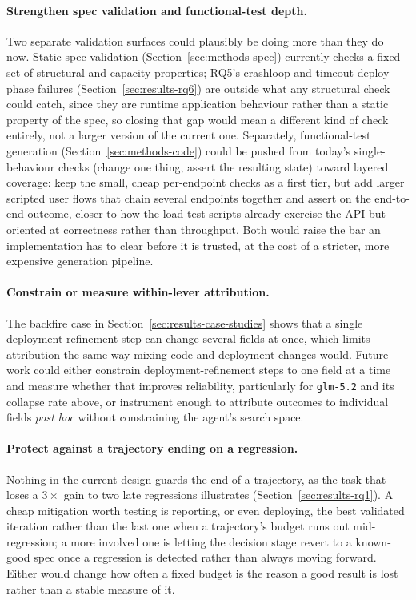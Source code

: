 \paragraph{Strengthen spec validation and functional-test depth.} Two
separate validation surfaces could plausibly be doing more than they do
now. Static spec validation (Section~\ref{sec:methods-spec}) currently
checks a fixed set of structural and capacity properties; RQ5's
crashloop and timeout deploy-phase failures
(Section~\ref{sec:results-rq6}) are outside what any structural check
could catch, since they are runtime application behaviour rather than a
static property of the spec, so closing that gap would mean a different
kind of check entirely, not a larger version of the current one.
Separately, functional-test generation (Section~\ref{sec:methods-code})
could be pushed from today's single-behaviour checks (change one thing,
assert the resulting state) toward layered coverage: keep the small,
cheap per-endpoint checks as a first tier, but add larger scripted user
flows that chain several endpoints together and assert on the
end-to-end outcome, closer to how the load-test scripts already exercise
the API but oriented at correctness rather than throughput. Both would
raise the bar an implementation has to clear before it is trusted, at the
cost of a stricter, more expensive generation pipeline.

\paragraph{Constrain or measure within-lever attribution.} The backfire
case in Section~\ref{sec:results-case-studies} shows that a single deployment-refinement
step can change several fields at once, which limits attribution the same
way mixing code and deployment changes would. Future work could either constrain
deployment-refinement steps to one field at a time and measure whether that
improves reliability, particularly for \texttt{glm-5.2} and its collapse
rate above, or instrument enough
to attribute outcomes to individual fields \emph{post hoc} without
constraining the agent's search space.

\paragraph{Protect against a trajectory ending on a regression.} Nothing
in the current design guards the end of a trajectory, as the task that
loses a $3\times$ gain to two late regressions illustrates
(Section~\ref{sec:results-rq1}).
A cheap mitigation worth testing is reporting, or even deploying, the best
validated iteration rather than the last one when a trajectory's budget
runs out mid-regression; a more involved one is letting the decision stage
revert to a known-good spec once a regression is detected rather than
always moving forward. Either would change how often a fixed budget is
the reason a good result is lost rather than a stable measure of it.

